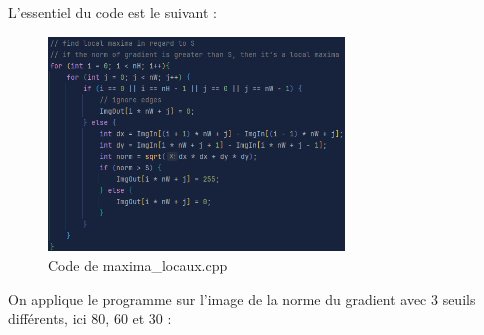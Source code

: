 \documentclass[french,a4paper,10pt]{article}
\begin{document}
    L'essentiel du code est le suivant : %
    \begin{figure}[!htb]
        \centering
        \includegraphics[width=0.7\textwidth]{out/code-maxima-locaux}
        \caption{Code de maxima\_locaux.cpp}\label{fig:code-maxima-locaux}
    \end{figure}

    On applique le programme sur l'image de la norme du gradient avec 3 seuils différents, ici 80, 60 et 30 : %
\end{document}
